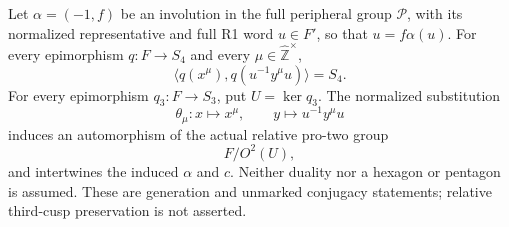Let \(\alpha=(-1,f)\) be an involution in the full peripheral
group \(\mathcal P\), with its normalized representative and
full R1 word \(u\in F'\), so that \(u=f\alpha(u)\).
For every epimorphism \(q:F\to S_4\) and every
\(\mu\in\widehat{\mathbb Z}^{\times}\),
\[
        \bigl\langle q(x^\mu),q(u^{-1}y^\mu u)\bigr\rangle=S_4.
 \tag{C.39.1}
\]
For every epimorphism \(q_3:F\to S_3\), put \(U=\ker q_3\).
The normalized substitution
\[
       \theta_\mu:x\longmapsto x^\mu,\qquad
                 y\longmapsto u^{-1}y^\mu u
\]
induces an automorphism of the actual relative pro-two group
\[
                              F/O^2(U),
 \tag{C.39.2}
\]
and intertwines the induced \(\alpha\) and \(c\).
Neither duality nor a hexagon or pentagon is assumed. These are
generation and unmarked conjugacy statements; relative third-cusp
preservation is not asserted.


